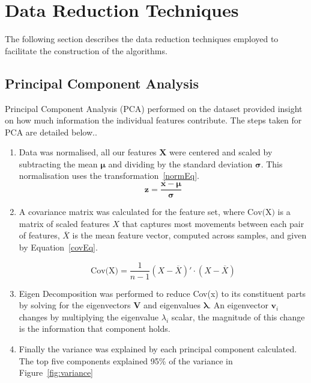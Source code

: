 \documentclass{ieeeaccess}
\begin{document}
\section{Data Reduction Techniques}
The following section describes the data reduction techniques employed to facilitate the construction of the algorithms.

\subsection{Principal Component Analysis}

Principal Component Analysis (PCA) performed on the dataset provided insight on how much information the individual features contribute. The steps taken for PCA are detailed below..

\begin{enumerate}

\item Data was normalised, all our features $\mathbf{X}$ were centered and scaled by subtracting the mean $\boldsymbol{\mu}$ and dividing by the standard deviation $\boldsymbol{\sigma}$. This normalisation uses the transformation~\ref{normEq}.
\begin{equation}
\mathbf{z} = \frac{\mathbf{x} - \boldsymbol{\mu}}{\boldsymbol{\sigma}}
\label{normEq}
\end{equation}

\item A covariance matrix was calculated for the feature set, where $\text{Cov(X)}$ is a matrix of scaled features $X$ that captures most movements between each pair of features,  \( \overline{X} \) is the mean feature vector, computed across samples, and given by Equation~\ref{covEq}.

\begin{equation} \label{covEq}
\text{Cov(X)} = \frac{1}{n-1}(X - \overline{X})' \cdot (X - \overline{X})
\end{equation}

\item Eigen Decomposition was performed to reduce Cov(x) to its constituent parts by solving for the eigenvectors \( \mathbf{V} \) and eigenvalues \( \boldsymbol{\lambda} \). An eigenvector \( \mathbf{v}_i \) changes by multiplying the eigenvalue \( \lambda_i \) scalar, the magnitude of this change is the information that component holds.

\item Finally the variance was explained by each principal component calculated. The top five components explained 95\% of the variance in Figure~\ref{fig:variance}

\end{enumerate}
\end{document}
